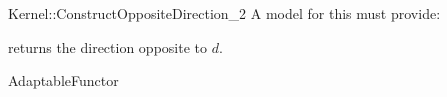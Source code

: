 \begin{ccRefFunctionObjectConcept}{Kernel::ConstructOppositeDirection_2}
A model for this must provide:


 {returns the direction opposite to $d$.}

\ccRefines
AdaptableFunctor

\ccSeeAlso
{} \\

\end{ccRefFunctionObjectConcept}
